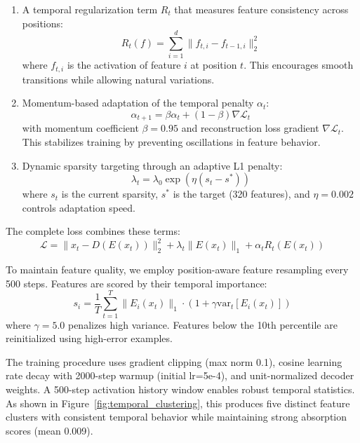 \documentclass{article} %
\begin{document}
\begin{enumerate}
    \item A temporal regularization term $R_t$ that measures feature consistency across positions:
    \begin{equation}
    R_t(f) = \sum_{i=1}^{d} \|f_{t,i} - f_{t-1,i}\|_2^2
    \end{equation}
    where $f_{t,i}$ is the activation of feature $i$ at position $t$. This encourages smooth transitions while allowing natural variations.

    \item Momentum-based adaptation of the temporal penalty $\alpha_t$:
    \begin{equation}
    \alpha_{t+1} = \beta\alpha_t + (1-\beta)\nabla\mathcal{L}_t
    \end{equation}
    with momentum coefficient $\beta=0.95$ and reconstruction loss gradient $\nabla\mathcal{L}_t$. This stabilizes training by preventing oscillations in feature behavior.

    \item Dynamic sparsity targeting through an adaptive L1 penalty:
    \begin{equation}
    \lambda_t = \lambda_0 \exp(\eta(s_t - s^*))
    \end{equation}
    where $s_t$ is the current sparsity, $s^*$ is the target (320 features), and $\eta=0.002$ controls adaptation speed.
\end{enumerate}

The complete loss combines these terms:
\begin{equation}
\mathcal{L} = \|x_t - D(E(x_t))\|_2^2 + \lambda_t\|E(x_t)\|_1 + \alpha_t R_t(E(x_t))
\end{equation}

To maintain feature quality, we employ position-aware feature resampling every 500 steps. Features are scored by their temporal importance:
\begin{equation}
s_i = \frac{1}{T}\sum_{t=1}^T \|E_i(x_t)\|_1 \cdot (1 + \gamma\text{var}_t[E_i(x_t)])
\end{equation}
where $\gamma=5.0$ penalizes high variance. Features below the 10th percentile are reinitialized using high-error examples.

The training procedure uses gradient clipping (max norm 0.1), cosine learning rate decay with 2000-step warmup (initial lr=5e-4), and unit-normalized decoder weights. A 500-step activation history window enables robust temporal statistics. As shown in Figure~\ref{fig:temporal_clustering}, this produces five distinct feature clusters with consistent temporal behavior while maintaining strong absorption scores (mean 0.009).
\end{document}
